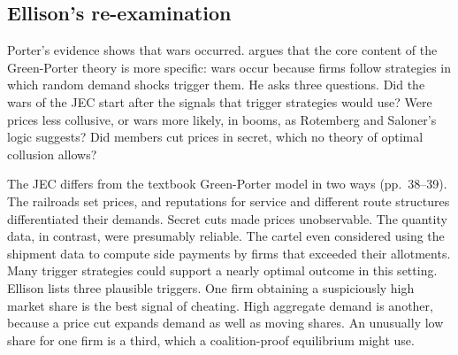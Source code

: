 \subsection{Ellison's re-examination}\label{sec:13-ellison}

Porter's evidence shows that wars occurred.  argues that the core content of the
Green-Porter theory is more specific: wars occur because firms follow strategies in which random demand shocks
trigger them. He asks three questions. Did the wars of the JEC start after the signals that trigger strategies would
use? Were prices less collusive, or wars more likely, in booms, as Rotemberg and Saloner's logic suggests? Did
members cut prices in secret, which no theory of optimal collusion allows?

The JEC differs from the textbook Green-Porter model in two ways (pp.~38--39). The railroads set prices, and
reputations for service and different route structures differentiated their demands. Secret cuts made prices
unobservable. The quantity data, in contrast, were presumably reliable. The cartel even considered using the shipment
data to compute side payments by firms that exceeded their allotments. Many trigger strategies could support a
nearly optimal outcome in this setting. Ellison lists three plausible triggers. One firm obtaining a suspiciously high
market share is the best signal of cheating. High aggregate demand is another, because a price cut expands demand as
well as moving shares. An unusually low share for one firm is a third, which a coalition-proof equilibrium might use.

